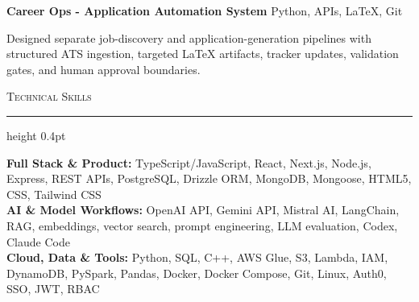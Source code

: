 \documentclass[letterpaper,11pt]{article}
\newcommand{\resumesection}[1]{%
  \par\vspace{2pt}%
  {\large\scshape #1}\par\vspace{2pt}%
  \hrule height 0.4pt\vspace{2pt}%
}
\newcommand{\projectHeading}[2]{
  \textbf{#1} \hfill #2
}
\begin{document}
\projectHeading{Career Ops - Application Automation System}{Python, APIs, LaTeX, Git}
\begin{tightitemize}
  \item Designed separate job-discovery and application-generation pipelines with structured ATS ingestion, targeted LaTeX artifacts, tracker updates, validation gates, and human approval boundaries.
\end{tightitemize}

\resumesection{Technical Skills}
\textbf{Full Stack \& Product:} TypeScript/JavaScript, React, Next.js, Node.js, Express, REST APIs, PostgreSQL, Drizzle ORM, MongoDB, Mongoose, HTML5, CSS, Tailwind CSS\\
\textbf{AI \& Model Workflows:} OpenAI API, Gemini API, Mistral AI, LangChain, RAG, embeddings, vector search, prompt engineering, LLM evaluation, Codex, Claude Code\\
\textbf{Cloud, Data \& Tools:} Python, SQL, C++, AWS Glue, S3, Lambda, IAM, DynamoDB, PySpark, Pandas, Docker, Docker Compose, Git, Linux, Auth0, SSO, JWT, RBAC
\end{document}
